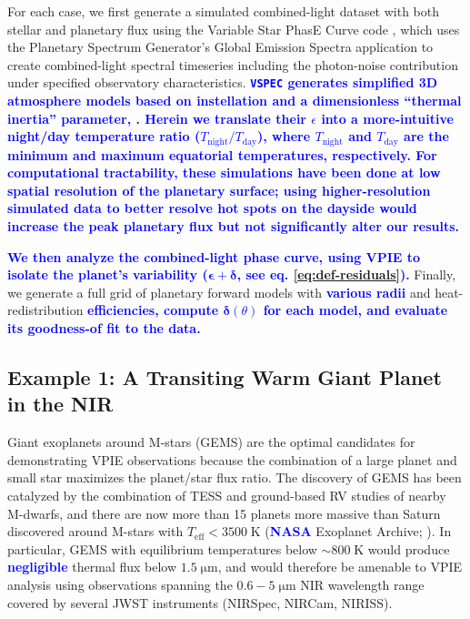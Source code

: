 \documentclass[twocolumn,linenumbers]{aastex7}
\newcommand{\update}[1]{\textcolor{blue}{\bf #1}}
\begin{document}
For each case, we first generate a simulated combined-light dataset with both stellar and planetary flux using the Variable Star PhasE Curve code \citep[\texttt{VSPEC, }][]{johnson2025}, which uses the Planetary Spectrum Generator's Global Emission Spectra application \citep[PSG/GlobES][]{villanueva2018,kofman2024} to create combined-light spectral timeseries including the photon-noise contribution under specified observatory characteristics. \update{\texttt{VSPEC} generates simplified 3D atmosphere models based on instellation and a dimensionless ``thermal inertia'' parameter, \citep[$\epsilon$, see][]{cowan2011}. Herein we translate their $\epsilon$ into a more-intuitive night/day temperature ratio ($T_\mathrm{night}/T_\mathrm{day}$), where $T_\mathrm{night}$ and $T_\mathrm{day}$ are the minimum and maximum equatorial temperatures, respectively. For computational tractability, these simulations have been done at low spatial resolution of the planetary surface; using higher-resolution simulated data to better resolve hot spots on the dayside would increase the peak planetary flux but not significantly alter our results.}

\update{
We then analyze the combined-light phase curve, using VPIE to isolate the planet's variability ($\bm{\epsilon}+\bm{\delta}$, see eq. \ref{eq:def-residuals}).}
Finally, we generate a full grid of planetary forward models with \update{various radii}  and heat-redistribution \update{efficiencies, compute $\bm{\delta}(\theta)$ for each model, and evaluate its goodness-of fit to the data. 
}

\subsection{Example 1: A Transiting Warm Giant Planet in the NIR}\label{subsec:toi519}

Giant exoplanets around M-stars (GEMS) are the optimal candidates for demonstrating VPIE observations because the combination of a large planet and small star maximizes the planet/star flux ratio. The discovery of GEMS has been catalyzed by the combination of TESS and ground-based RV studies of nearby M-dwarfs, and there are now more than 15 planets more massive than Saturn discovered around M-stars with $T_\mathrm{eff}<3500\;\mathrm{K}$ (\update{NASA} Exoplanet Archive; \citealt{nea13,christiansen2025}). In particular, GEMS with equilibrium temperatures below $\sim800\;\mathrm{K}$ would produce \update{negligible} thermal flux below $1.5\;\mathrm{\mu m}$, and would therefore be amenable to VPIE analysis using observations spanning the $0.6 - 5\;\mathrm{\mu m}$ NIR wavelength range covered by several JWST instruments (NIRSpec, NIRCam, NIRISS).
\end{document}
